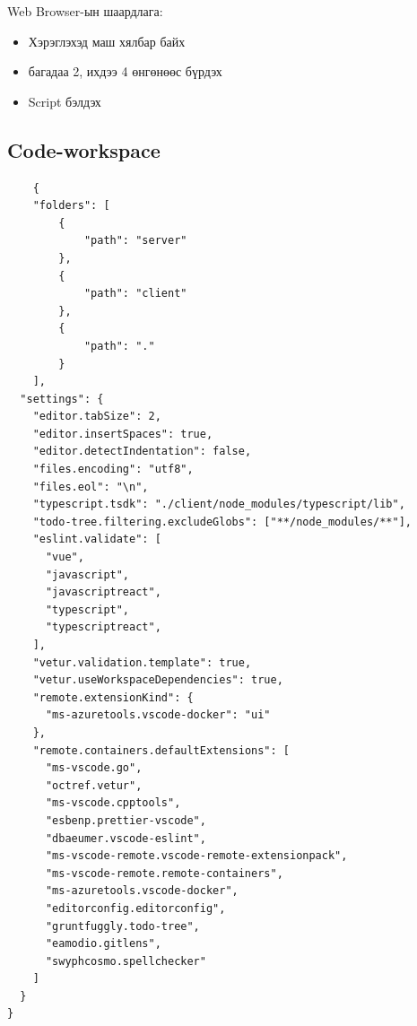 Web Browser-ын шаардлага: 
\begin{itemize}
    \item Хэрэглэхэд маш хялбар байх
    \item багадаа 2, ихдээ 4 өнгөнөөс бүрдэх
    \item Script бэлдэх
\end{itemize}
\pagebreak

\subsection{Code-workspace}

\begin{lstlisting}
	{
	"folders": [
		{
			"path": "server"
		},
		{
			"path": "client"
		},
		{
			"path": "."
		}
	],
  "settings": {
    "editor.tabSize": 2,
    "editor.insertSpaces": true,
    "editor.detectIndentation": false,
    "files.encoding": "utf8",
    "files.eol": "\n",
    "typescript.tsdk": "./client/node_modules/typescript/lib",
    "todo-tree.filtering.excludeGlobs": ["**/node_modules/**"],
    "eslint.validate": [
      "vue",
      "javascript",
      "javascriptreact",
      "typescript",
      "typescriptreact",
    ],
    "vetur.validation.template": true,
    "vetur.useWorkspaceDependencies": true,
    "remote.extensionKind": {
      "ms-azuretools.vscode-docker": "ui"
    },
    "remote.containers.defaultExtensions": [
      "ms-vscode.go",
      "octref.vetur",
      "ms-vscode.cpptools",
      "esbenp.prettier-vscode",
      "dbaeumer.vscode-eslint",
      "ms-vscode-remote.vscode-remote-extensionpack",
      "ms-vscode-remote.remote-containers",
      "ms-azuretools.vscode-docker",
      "editorconfig.editorconfig",
      "gruntfuggly.todo-tree",
      "eamodio.gitlens",
      "swyphcosmo.spellchecker"
    ]
  }
}
\end{lstlisting}
\pagebreak

